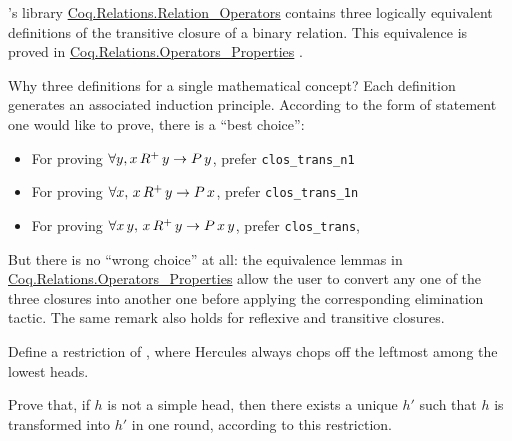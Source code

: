 \begin{remark}
\label{remark:transitive-closure}
\coq's library \href{https://coq.inria.fr/distrib/current/stdlib/Coq.Relations.Relation_Operators.html}{Coq.Relations.Relation\_Operators} 
contains three logically equivalent definitions of the transitive closure of a binary relation. This equivalence is proved in 
\href{https://coq.inria.fr/distrib/current/stdlib/Coq.Relations.Operators_Properties.html}{Coq.Relations.Operators\_Properties} . 

Why three definitions for a single mathematical concept?
Each definition generates an associated induction principle. 
 According to the form of statement one would like to prove, there is a ``best choice'':

\begin{itemize}
\item For proving $\forall y, x\,R^+\,y \;\mbox{$\rightarrow$}\; P\,y$, prefer 
\texttt{clos\_trans\_n1}
\item For proving $\forall x,\,x\,R^+\,y \;\mbox{$\rightarrow$}\; P\,x$, prefer \texttt{clos\_trans\_1n}
\item For proving $\forall x\,y, \,x\,R^+\,y \;\mbox{$\rightarrow$}\;P\,x\,y$,  
prefer \texttt{clos\_trans},
\end{itemize}
But there is no ``wrong choice'' at all: the equivalence lemmas in \linebreak 
\href{https://coq.inria.fr/distrib/current/stdlib/Coq.Relations.Operators_Properties.html}{Coq.Relations.Operators\_Properties} 
 allow the user
to convert any one of the three closures into another one before applying the corresponding elimination tactic.
The same remark also holds for reflexive and transitive closures. 
\end{remark}


\begin{exercise}
Define a restriction of ,  where Hercules always chops off
the leftmost among the lowest heads.

Prove that, if $h$ is not a simple head, then there exists a unique $h'$ such that $h$  is transformed into $h'$ in one round, according to this restriction.


\end{exercise}


